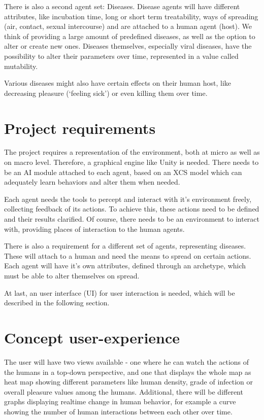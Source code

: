 \documentclass{acmtog} %
\begin{document}
There is also a second agent set: Diseases. Disease agents will have different attributes, like incubation time, long or short term treatability, ways of spreading (air, contact, sexual intercourse) and are attached to a human agent (host). We think of providing a large amount of predefined diseases, as well as the option to alter or create new ones. Diseases themselves, especially viral diseases, have the possibility to alter their parameters over time, represented in a value called mutability.

Various diseases might also have certain effects on their human host, like decreasing pleasure (`feeling sick') or even killing them over time. 

\section{Project requirements}

The project requires a representation of the environment, both at micro as well as on macro level. Therefore, a graphical engine like Unity is needed. There needs to be an AI module attached to each agent, based on an XCS model which can adequately learn behaviors and alter them when needed.

Each agent needs the tools to percept and interact with it's environment freely, collecting feedback of its actions. To achieve this, these actions need to be defined and their results clarified. Of course, there needs to be an environment to interact with, providing places of interaction to the human agents.

There is also a requirement for a different set of agents, representing diseases. These will attach to a human and need the means to spread on certain actions. Each agent will have it's own attributes, defined through an archetype, which must be able to alter themselves on spread.

At last, an user interface (UI) for user interaction is needed, which will be described in the following section.

\section{Concept user-experience}

The user will have two views available - one where he can watch the actions of the humans in a top-down perspective, and one that displays the whole map as heat map showing different parameters like human density, grade of infection or overall pleasure values among the humans. Additional, there will be different graphs displaying realtime change in human behavior, for example a curve showing the number of human interactions between each other over time.
\end{document}
